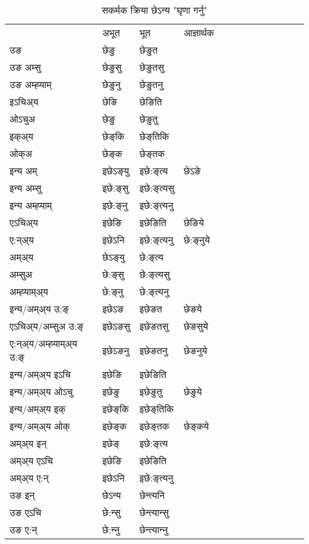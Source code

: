 \begin{table}[H]
\centering
\caption{\label{eŋ.vt} सकर्मक क्रिया  छेऽन्य  "घृणा गर्नु"  }
\begin{tabular}{l|l|l|l|l|l|l|l|l|l|l|l|l}  \toprule
&अभूत & भूत & आज्ञार्थक \\ 
उङ &छेङु &छेङुत \\ 
उङ अम्सु &छेङुसु &छेङुतसु \\ 
उङ अम्ह्‍याम् &छेङुनु &छेङुतनु \\ 
इऽचिअ्य &छेङि &छेङिति   \\ 
ओऽचुअ &छेङु &छेङुतु   \\ 
इक्अ्य &छेङ्‌कि &छेङ्‌तिकि   \\ 
ओक्अ &छेङ्‌क &छेङ्‌तक   \\ 
इन्य अम् & इछेऽङ्‌यु  & इछे:ङ्‌त्य &छेऽङे  \\ 
इन्य अम्सु & इछे:ङ्‌सु  & इछे:ङ्‌त्यसु   \\ 
इन्य अम्ह्‍याम् & इछे:ङ्‌नु  & इछे:ङ्‌त्यनु   \\ 
एऽचिअ्य & इछेङि & इछेङिति &छेङिये    \\ 
ए:न्अ्य & इछेऽनि  & इछे:ङ्‌त्यनु &छे:ङ्‌नुये  \\ 
अम्अ्य & छेऽङ्‌यु  & छे:ङ्‌त्य  \\ 
अम्सुअ & छे:ङ्‌सु & छे:ङ्‌त्यसु  \\ 
अम्ह्‍याम्अ्य & छे:ङ्‌नु  & छे:ङ्‌त्यनु \\ 
\midrule
इन्य/अम्अ्य उ:ङ्‌&इछेऽङ & इछेङत &छेङये \\ 
एऽचिअ्य/अम्सुअ उ:ङ्‌ &इछेऽङसु & इछेङतसु &छेङसुये \\ 
ए:न्अ्य/अम्ह्‍याम्अ्य उ:ङ्‌ &इछेऽङनु & इछेङतनु &छेङनुये \\ 
इन्य/अम्अ्य इऽचि & इछेङि & इछेङिति    \\ 
इन्य/अम्अ्य ओऽचु & इछेङु & इछेङुतु  &छेङुये  \\ 
इन्य/अम्अ्य इक् & इछेङ्‌कि & इछेङ्‌तिकि   \\ 
इन्य/अम्अ्य ओक् & इछेङ्‌क & इछेङ्‌तक  &छेङ्‌कये  \\ 
अम्अ्य इन् & इछेङ्‌ & इछे:ङ्‌त्य   \\ 
अम्अ्य एऽचि & इछेङि & इछेङिति    \\ 
अम्अ्य ए:न् & इछेऽनि  & इछे:ङ्‌त्यनु  \\ 
\midrule
उङ इन् & छेऽन्य  & छेन्त्यनि  \\ 
उङ एऽचि & छे:न्सु  & छेन्त्यान्सु   \\ 
उङ ए:न्& छे:न्‍नु  & छेन्त्यान्‍नु   \\ 
\bottomrule
\end{tabular}
\end{table}


